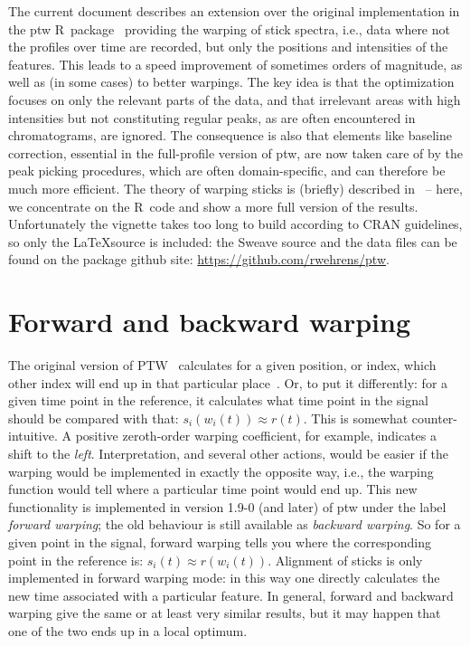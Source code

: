 \documentclass[a4paper,11pt]{article}
\newcommand{\pkg}[1]{{\normalfont\fontseries{b}\selectfont #1}}
\newcommand{\proglang}[1]{{\sffamily #1}}
\newcommand{\code}[1]{{\ttfamily #1}}
\newcommand{\R}{\proglang{R}}
\begin{document}
The current document describes an extension over the original
implementation in the \pkg{ptw} \R\ package~\citep{Bloemberg2010}
providing the warping of stick spectra, i.e., data where not the 
profiles over time are recorded, but only the positions and intensities
of the features. This leads to a speed improvement of
sometimes orders of magnitude, as well as (in some cases) to better
warpings. The key idea is that the optimization focuses on only the
relevant parts of the data, and that irrelevant areas with high
intensities but not constituting regular peaks, as are often
encountered in chromatograms, are ignored. The
consequence is also that elements like baseline correction, essential
in the full-profile version of \code{ptw}, are now taken care of by
the peak picking procedures, which are often domain-specific, and can
therefore be much more efficient. The theory of warping sticks is
(briefly) described in~\citet{Wehrens2015a} -- here, we concentrate on
the \R\ code and show a more full version of the
results. Unfortunately the vignette takes too long to build according
to CRAN guidelines, so only the \LaTeX source is included: the Sweave
source and the data files can be found on the package github site:
\url{https://github.com/rwehrens/ptw}.

\section{Forward and backward warping}
The original version of PTW~\citep{Eilers2004} calculates for a given
position, or index, which other index will end up in that particular
place~\citep{Bloemberg2013}. Or, to put it differently: for a given
time point in the reference, it calculates what time point in
the signal should be compared with that: $s_i(w_i(t)) \approx r(t)$.
This is somewhat counter-intuitive. A positive zeroth-order warping
coefficient, for example, indicates a shift to the
\emph{left}. Interpretation, and several other actions, would be
easier if the warping would be implemented in exactly the opposite
way, i.e., the warping function would tell where a particular time
point would end up. This new functionality is implemented in version
1.9-0 (and later) of \pkg{ptw} under the label \emph{forward warping};
the old behaviour is still available as \emph{backward warping}. So
for a given point in the signal, forward warping tells you where the
corresponding point in the reference is: 
$s_i(t) \approx r(w_i(t))$.
Alignment of sticks is only implemented in forward warping mode: in
this way one directly calculates the new time associated with a
particular feature. In general, forward and backward warping give the
same or at least very similar results, but it may happen that one of
the two ends up in a local optimum.
\end{document}
